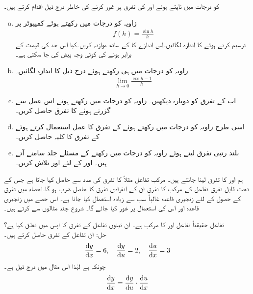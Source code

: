  کو درجات میں ناپتے ہوئے  اور  کی تفرق پر غور کرنے کی خاطر درج ذیل اقدام کرتے ہیں۔
\begin{enumerate}[a.]

\item
زاویہ کو درجات میں رکھتے ہوئے کمپیوٹر پر
\begin{align*}
f(h)=\frac{\sin h}{h}
\end{align*}
ترسیم کرتے ہوئے  کا اندازہ لگائیں۔اس اندازے کا  کے ساتھ موازنہ کریں۔کیا اس حد کی قیمت  کے برابر ہونے کی کوئی وجہ پیش کی جا سکتی ہے۔
\item
زاویہ کو درجات میں ہی رکھتے ہوئے درج ذیل کا اندازہ لگائیں۔
\begin{align*}
\lim_{h\to 0} \frac{\cos h-1}{h}
\end{align*}
\item
اب  کے تفرق کو دوبارہ دیکھیں۔ زاویہ کو درجات میں رکھتے ہوئے اس عمل سے گزرتے ہوئے  کا تفرق حاصل کریں۔
\item
اسی طرح زاویہ کو درجات میں رکھتے ہوئے  کے تفرق کا عمل استعمال کرتے ہوئے  کے تفرق کا کلیہ حاصل کریں۔
\item
بلند رتبی تفرق لیتے ہوئے زاویہ کو درجات میں رکھنے کے مسئلے جلد سامنے آتے ہیں۔ اور  کے لئے  اور  تلاش کریں۔
\end{enumerate}

ہم  اور  کا تفرق لینا جانتے ہیں۔ مرکب تفاعل مثلاً  کا تفرق  کی مدد سے حاصل کیا جاتا ہے جس کے تحت قابل تفرق تفاعل کے مرکب کا تفرق ان کے انفرادی تفرق کا حاصل ضرب ہو گا۔احصاء  میں تفرق کے حصول کے لئے  زنجیری قاعدہ  غالباً سب سے زیادہ استعمال کیا جاتا ہے۔ اس حصے میں زنجیری قاعدہ اور اس کی استعمال پر غور کیا جائے گا۔ شروع چند مثالوں سے کرتے ہیں۔

تفاعل  حقیقتاً تفاعل  اور  کا مرکب ہے۔ ان تینوں تفاعل کے تفرق کا آپس میں تعلق کیا ہے؟\\
حل:\quad
ان تفاعل کے تفرق حاصل کرتے ہیں۔
\begin{align*}
\frac{\dif y}{\dif x}=6,\quad \frac{\dif y}{\dif u}=2,\quad \frac{\dif u}{\dif x}=3
\end{align*}
چونکہ  ہے لہٰذا اس مثال میں درج ذیل ہے۔
\begin{align*}
\frac{\dif y}{\dif x}=\frac{\dif y}{\dif u}\cdot \frac{\dif u}{\dif x}
\end{align*}

